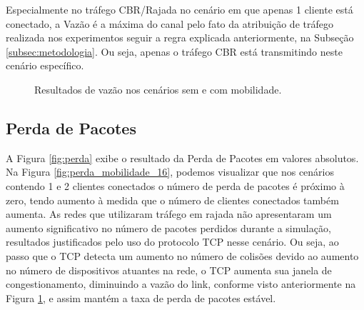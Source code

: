 \documentclass[12pt]{article}
\begin{document}
Especialmente no tráfego CBR/Rajada no cenário em que apenas 1 cliente está conectado, a Vazão é a máxima do canal pelo fato da atribuição de tráfego realizada nos experimentos seguir a regra explicada anteriormente, na Subseção \ref{subsec:metodologia}. Ou seja, apenas o tráfego CBR está transmitindo neste cenário específico. 

\begin{figure}[ht]
	\centering
	\caption{Resultados de vazão nos cenários sem e com mobilidade.}
	\label{fig:vazao}
\end{figure}


\subsection{Perda de Pacotes}
\label{subsec:perda_16}

A Figura \ref{fig:perda} exibe o resultado da Perda de Pacotes em valores absolutos. Na Figura \ref{fig:perda_mobilidade_16}, podemos visualizar que nos cenários contendo 1 e 2 clientes conectados o número de perda de pacotes é próximo à zero, tendo aumento à medida que o número de clientes conectados também aumenta. As redes que utilizaram tráfego em rajada não apresentaram um aumento significativo no número de pacotes perdidos durante a simulação, resultados justificados pelo uso do protocolo TCP nesse cenário. Ou seja, ao passo que o TCP detecta um aumento no número de colisões devido ao aumento no número de dispositivos atuantes na rede, o TCP aumenta sua janela de congestionamento, diminuindo a vazão do link, conforme visto anteriormente na Figura \ref{fig:vazao}, e
assim mantém a taxa de perda de pacotes estável.
\end{document}
